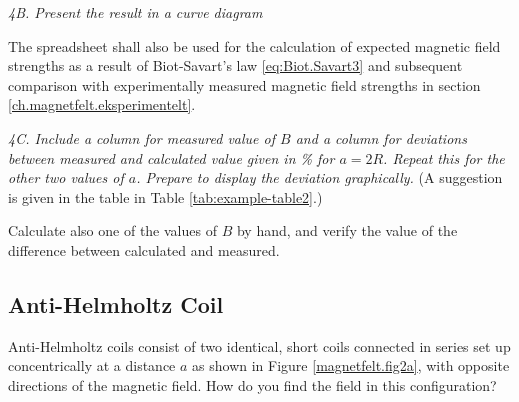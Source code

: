 \documentclass[../Elmag-labhefte-2020.tex]{subfiles}
\begin{document}
\emph{4B. Present the result in a curve diagram}

The spreadsheet shall also be used for the calculation of expected magnetic field strengths as a result of Biot-Savart's law \eqref{eq:Biot.Savart3} and subsequent comparison with experimentally measured magnetic field strengths in section \ref{ch.magnetfelt.eksperimentelt}.

\emph{4C. Include a column for measured value of $B$ and a column for deviations between measured and calculated value given in \si{\percent} for $a = 2R$. Repeat this for the other two values   of $a$. Prepare to display the deviation graphically.} (A suggestion is given in the table in Table \ref{tab:example-table2}.)

Calculate also one of the values of $B$ by hand, and verify the value of the difference between calculated and measured.

\subsection{Anti-Helmholtz Coil}
Anti-Helmholtz coils consist of two identical, short coils connected in series set up concentrically at a distance $a$ as shown in Figure \ref{magnetfelt.fig2a}, with opposite directions of the magnetic field. How do you find the field in this configuration?
\end{document}
